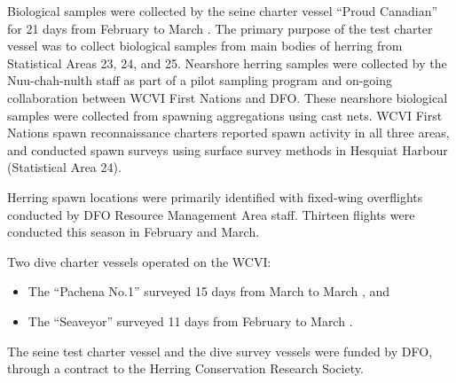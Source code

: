 Biological samples were collected by the seine charter vessel ``Proud Canadian'' for 21 days from February  to March .
The primary purpose of the test charter vessel was to collect biological samples from main bodies of herring from Statistical Areas 23, 24, and 25.
Nearshore herring samples were collected by the Nuu-chah-nulth staff as part of a pilot sampling program and on-going collaboration between WCVI First Nations and DFO.
These nearshore biological samples were collected from spawning aggregations using cast nets.
WCVI First Nations spawn reconnaissance charters reported spawn activity in all three areas,
and conducted spawn surveys using surface survey methods in Hesquiat Harbour (Statistical Area 24).

Herring spawn locations were primarily identified with fixed-wing overflights conducted by DFO Resource Management Area staff.
Thirteen flights were conducted this season in February and March.

Two dive charter vessels operated on the WCVI:
\begin{itemize}
\item The ``Pachena No.1'' surveyed 15 days from March  to March , and
\item The ``Seaveyor'' surveyed 11 days from February  to March .
\end{itemize}
The seine test charter vessel and the dive survey vessels were funded by DFO, through a contract to the Herring Conservation Research Society.